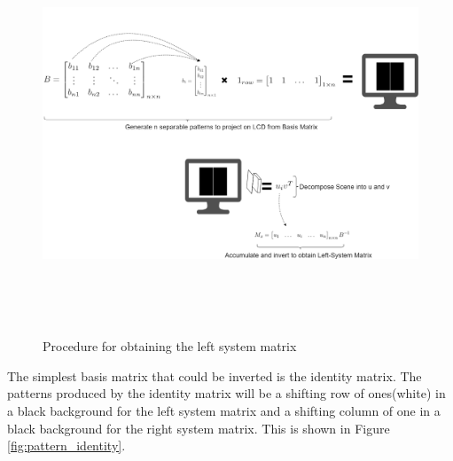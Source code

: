 \begin{figure}[h]
\centering
\includegraphics[width = 1\linewidth,height=12cm]{pics/system_matrix_estimation_2.png}
\caption{Procedure for obtaining the left system matrix}
\label{fig:sys_est}
\end{figure}
The simplest basis matrix that could be inverted is the identity matrix. The patterns produced by the identity matrix will be a shifting row of ones(white) in a black background for the left system matrix and a shifting column of one in a black background for the right system matrix. This is shown in Figure \ref{fig:pattern_identity}.


